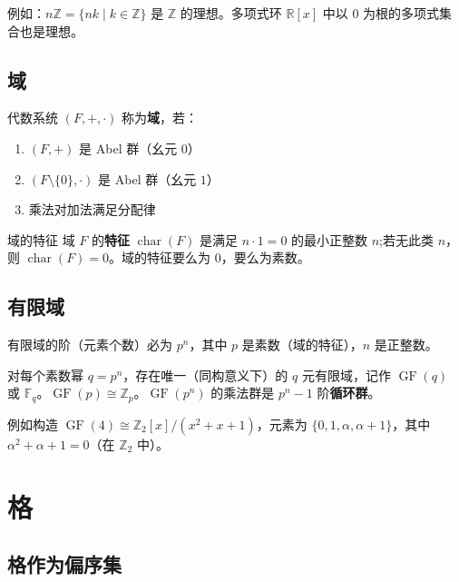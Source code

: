 例如：$n\mathbb{Z} = \{nk \mid k\in\mathbb{Z}\}$ 是 $\mathbb{Z}$ 的理想。多项式环 $\mathbb{R}[x]$ 中以 $0$ 为根的多项式集合也是理想。

\subsection{域}

\begin{mydefinition}{}
代数系统 $(F,+,\cdot)$ 称为\textbf{域}，若：
\begin{enumerate}
    \item $(F,+)$ 是 Abel 群（幺元 $0$）
    \item $(F\setminus\{0\}, \cdot)$ 是 Abel 群（幺元 $1$）
    \item 乘法对加法满足分配律
\end{enumerate}
\end{mydefinition}

\begin{myTheorem}{域的特征}
域 $F$ 的\textbf{特征} $\operatorname{char}(F)$ 是满足 $n\cdot 1=0$ 的最小正整数 $n$;若无此类 $n$，则 $\operatorname{char}(F)=0$。域的特征要么为 0，要么为素数。
\end{myTheorem}

\subsection{有限域}

\begin{myTheorem}{}
有限域的阶（元素个数）必为 $p^n$，其中 $p$ 是素数（域的特征），$n$ 是正整数。
\end{myTheorem}

对每个素数幂 $q = p^n$，存在唯一（同构意义下）的 $q$ 元有限域，记作 $\operatorname{GF}(q)$ 或 $\mathbb{F}_q$。$\operatorname{GF}(p) \cong \mathbb{Z}_p$。$\operatorname{GF}(p^n)$ 的乘法群是 $p^n-1$ 阶\textbf{循环群}。

例如构造 $\operatorname{GF}(4) \cong \mathbb{Z}_2[x] / (x^2+x+1)$，元素为 $\{0, 1, \alpha, \alpha+1\}$，其中 $\alpha^2+\alpha+1=0$（在 $\mathbb{Z}_2$ 中）。

\section{格}

\subsection{格作为偏序集}

